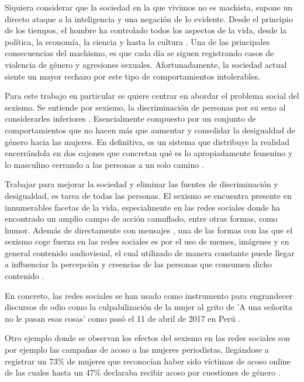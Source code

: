 \label{introducción}
Siquiera considerar que la sociedad en la que vivimos no es machista, supone un directo ataque a la inteligencia y una negación de lo evidente. Desde el principio de los tiempos, el hombre ha controlado todos los aspectos de la vida, desde la política, la economía, la ciencia y hasta la cultura \cite{puleo2005patriarcado}. Una de las principales consecuencias del machismo, es que cada día se siguen registrando casos de violencia de género y agresiones sexuales\cite{FU202214}. Afortunadamente, la sociedad actual siente un mayor rechazo por este tipo de comportamientos intolerables.

Para este trabajo en particular se quiere centrar en abordar el problema social del sexismo. Se entiende por sexismo, la discriminación de personas por su sexo al considerarles inferiores \cite{lampert2018definicion}. Esencialmente compuesto por un conjunto de comportamientos que no hacen más que aumentar y consolidar la desigualdad de género hacia las mujeres. En definitiva, es un sistema que distribuye la realidad encerrándola en dos cajones que concretan qué es lo apropiadamente femenino y lo masculino cerrando a las personas a un solo camino \cite{lampert2018definicion}.

Trabajar para mejorar la sociedad y eliminar las fuentes de discriminación y desigualdad, es tarea de todas las personas. El sexismo se encuentra presente en innumerables facetas de la vida, especialmente en las redes sociales donde ha encontrado un amplio campo de acción camuflado, entre otras formas, como humor\cite{rueda2014sexismo}. Además de directamente con mensajes , una de las formas con las que el sexismo coge fuerza en las redes sociales es por el uso de memes, imágenes y en general contenido audiovisual, el cual utilizado de manera constante puede llegar a influenciar la percepción y creencias de las personas que consumen dicho contenido \cite{pilay2021discurso}.

En concreto, las redes sociales se han usado como instrumento para engrandecer discursos de odio como la culpabilización de la mujer al grito de 'A una señorita no le pasan esas cosas' como pasó el 11 de abril de 2017 en Perú \cite{janos2019senorita}. 

Otro ejemplo donde se observan los efectos del sexismo en las redes sociales son por ejemplo las campañas de acoso a las mujeres periodistas, llegándose a registrar un 73\% de mujeres que reconocían haber sido víctimas de acoso online de las cuales hasta un 47\% declaraba recibir acoso por cuestiones de género \cite{posetti2020online}.

